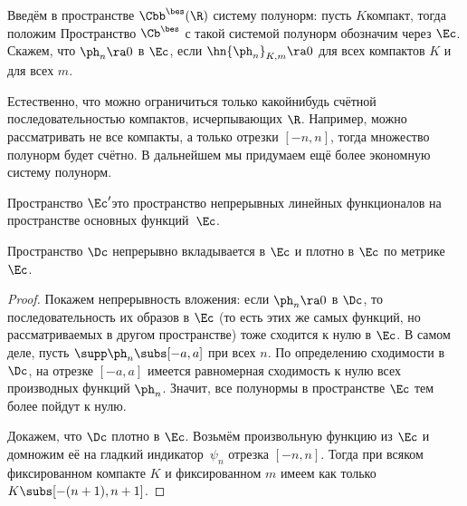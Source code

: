 \documentclass[a4paper]{article}
\begin{document}
Введём в пространстве $\Cbb^\bes(\R)$ систему полунорм: пусть $K$\т компакт, тогда
положим
Пространство $\Cb^\bes$ с такой системой полунорм обозначим через $\Ec$. Скажем, что
$\ph_n \ra 0$ в $\Ec$, если $\hn{\ph_n}_{K,m} \ra0$ для всех компактов $K$ и для всех $m$.

\begin{note}
Естественно, что можно ограничиться только какой\д нибудь счётной последовательностью компактов,
исчерпывающих $\R$. Например, можно рассматривать не все компакты, а только отрезки $[-n,n]$,
тогда множество полунорм будет счётно. В дальнейшем мы придумаем ещё более экономную систему
полунорм.
\end{note}

\begin{df}
Пространство $\Ec'$\т это пространство непрерывных линейных функционалов на пространстве основных функций~$\Ec$.
\end{df}


\begin{stm}
Пространство $\Dc$ непрерывно вкладывается в $\Ec$ и плотно в $\Ec$ по метрике $\Ec$.
\end{stm}
\begin{proof}
Покажем непрерывность вложения: если $\ph_n \ra 0$ в $\Dc$, то последовательность
их образов в $\Ec$ (то есть этих же самых функций, но рассматриваемых в другом пространстве)
тоже сходится к нулю в $\Ec$. В самом деле, пусть $\supp\ph_n \subs [-a,a]$ при всех $n$.
По определению сходимости в $\Dc$, на отрезке $[-a,a]$ имеется равномерная сходимость
к нулю всех производных функций $\ph_n$. Значит, все полунормы в пространстве $\Ec$ тем более
пойдут к нулю.

Докажем, что $\Dc$ плотно в $\Ec$. Возьмём произвольную функцию из $\Ec$ и домножим её
на гладкий индикатор~$\psi_n$ отрезка $[-n,n]$. Тогда при всяком фиксированном компакте $K$
и фиксированном $m$ имеем
как только $K \subs [-(n+1),n+1]$.
\end{proof}
\end{document}
